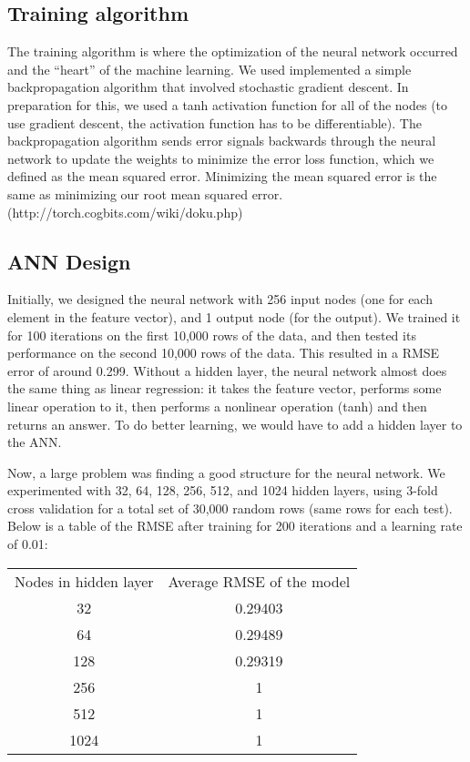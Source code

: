 \documentclass{article}
\begin{document}
\subsection{Training algorithm}
The training algorithm is where the optimization of the neural network
 occurred and the “heart” of the machine learning.  We used implemented 
 a simple backpropagation algorithm that involved stochastic
 gradient descent.  In 
 preparation for this, we used a tanh activation function for all of the
  nodes (to use gradient descent, the activation function has to be differentiable). 
   The backpropagation algorithm sends error signals backwards through the neural
    network to update the weights to minimize the error loss function, which we
     defined as the mean squared error.  Minimizing the mean squared error is
      the same as minimizing our root mean squared error.
(http://torch.cogbits.com/wiki/doku.php)

\subsection{ANN Design}
Initially, we designed the neural network with 256 input nodes
 (one for each element in the feature vector), and 1 output node
  (for the output).  We trained it for 100 iterations on the first 
  10,000 rows of the data, and then tested its performance on the 
  second 10,000 rows of the data.  This resulted in a RMSE error of
   around 0.299.  Without a hidden layer, the neural network almost
    does the same thing as linear regression: it takes the feature
     vector, performs some linear operation to it, then performs a 
     nonlinear operation (tanh) and then returns an answer.  To do better
      learning, we would have to add a hidden layer to the ANN.

Now, a large problem was finding a good structure for the neural network. 
 We experimented with 
32, 64, 128, 256, 512, and 1024 hidden layers, using 3-fold cross
validation for a total set of 30,000 random rows (same rows for each test).
Below is a table of the RMSE after training for 200 iterations and
a learning rate of 0.01:

\begin{tabular}{ c | c }
  Nodes in hidden layer & Average RMSE of the model  \\
  32 & 0.29403  \\
  64 & 0.29489  \\
  128 & 0.29319 \\
  256 & 1 \\
  512 & 1 \\
  1024 & 1 \\
\end{tabular}
\end{document}
